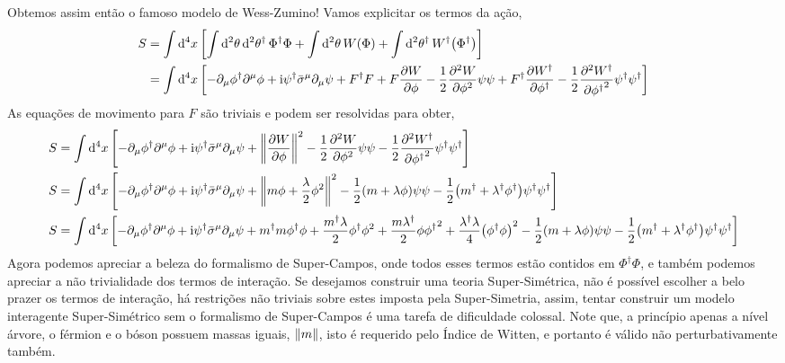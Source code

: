 Obtemos assim então o famoso modelo de Wess-Zumino! Vamos explicitar os termos da ação,
\begin{align*}
    S&=\int\dd[4]{x}\qty[\int\dd[2]{\theta}\dd[2]{\theta^\dagger}\Phi^\dagger\Phi+\int\dd[2]{\theta}W\qty(\Phi)+\int\dd[2]{\theta^\dagger}W^\dagger\qty(\Phi^\dagger)]\\
    &=\int\dd[4]{x}\qty[-\partial_\mu\phi^\dagger\partial^\mu\phi+\textnormal{i}\psi^\dagger{\bar\sigma}^\mu\partial_\mu\psi+F^\dagger F+F\pdv{W}{\phi}-\frac12\pdv[2]{W}{\phi}\psi\psi+F^\dagger\pdv{{W^\dagger}}{{\phi^\dagger}}-\frac12\pdv[2]{{W^\dagger}}{{\phi^\dagger}}\psi^\dagger\psi^\dagger]
\end{align*}
As equações de movimento para $F$ são triviais e podem ser resolvidas para obter,
\begin{align*}
    S&=\int\dd[4]{x}\qty[-\partial_\mu\phi^\dagger\partial^\mu\phi+\textnormal{i}\psi^\dagger{\bar\sigma}^\mu\partial_\mu\psi+\norm{\pdv{W}{\phi}}^2-\frac12\pdv[2]{W}{\phi}\psi\psi-\frac12\pdv[2]{{W^\dagger}}{{\phi^\dagger}}\psi^\dagger\psi^\dagger]\\
    S&=\int\dd[4]{x}\qty[-\partial_\mu\phi^\dagger\partial^\mu\phi+\textnormal{i}\psi^\dagger{\bar\sigma}^\mu\partial_\mu\psi+\norm{m\phi+\frac\lambda2\phi^2}^2-\frac12\qty(m+\lambda\phi)\psi\psi-\frac12\qty(m^\dagger+\lambda^\dagger\phi^\dagger)\psi^\dagger\psi^\dagger]\\
    S&=\int\dd[4]{x}\qty[-\partial_\mu\phi^\dagger\partial^\mu\phi+\textnormal{i}\psi^\dagger{\bar\sigma}^\mu\partial_\mu\psi+m^\dagger m\phi^\dagger\phi+\frac{m^\dagger\lambda}{2}\phi^\dagger\phi^2+\frac{m\lambda^\dagger}{2}\phi{\phi^\dagger}^2+\frac{\lambda^\dagger\lambda}{4}\qty(\phi^\dagger\phi)^2-\frac12\qty(m+\lambda\phi)\psi\psi-\frac12\qty(m^\dagger+\lambda^\dagger\phi^\dagger)\psi^\dagger\psi^\dagger]
\end{align*}
Agora podemos apreciar a beleza do formalismo de Super-Campos, onde todos esses termos estão contidos em $\Phi^\dagger\Phi$, e também podemos apreciar a não trivialidade dos termos de interação. 
Se desejamos construir uma teoria Super-Simétrica, não é possível escolher a belo prazer os termos de interação, há restrições não triviais sobre estes imposta pela Super-Simetria, 
assim, tentar construir um modelo interagente Super-Simétrico sem o formalismo de Super-Campos é uma tarefa de dificuldade colossal. Note que, a princípio apenas a nível árvore, o férmion e o bóson possuem 
massas iguais, $\norm{m}$, isto é requerido pelo Índice de Witten, e portanto é válido não perturbativamente também. 

